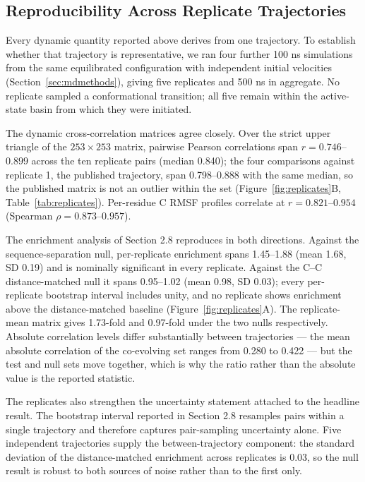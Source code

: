 \documentclass[utf8]{FrontiersinHarvard}
\begin{document}
\subsection{Reproducibility Across Replicate Trajectories}
\label{sec:replicates}

Every dynamic quantity reported above derives from one trajectory. To establish whether that trajectory is representative, we ran four further 100 ns simulations from the same equilibrated configuration with independent initial velocities (Section~\ref{sec:mdmethods}), giving five replicates and 500 ns in aggregate. No replicate sampled a conformational transition; all five remain within the active-state basin from which they were initiated.

The dynamic cross-correlation matrices agree closely. Over the strict upper triangle of the $253\times253$ matrix, pairwise Pearson correlations span $r = 0.746$--$0.899$ across the ten replicate pairs (median 0.840); the four comparisons against replicate 1, the published trajectory, span 0.798--0.888 with the same median, so the published matrix is not an outlier within the set (Figure~\ref{fig:replicates}B, Table~\ref{tab:replicates}). Per-residue C\textalpha{} RMSF profiles correlate at $r = 0.821$--$0.954$ (Spearman $\rho = 0.873$--$0.957$).

The enrichment analysis of Section 2.8 reproduces in both directions. Against the sequence-separation null, per-replicate enrichment spans 1.45--1.88 (mean 1.68, SD 0.19) and is nominally significant in every replicate. Against the C\textalpha{}--C\textalpha{} distance-matched null it spans 0.95--1.02 (mean 0.98, SD 0.03); every per-replicate bootstrap interval includes unity, and no replicate shows enrichment above the distance-matched baseline (Figure~\ref{fig:replicates}A). The replicate-mean matrix gives 1.73-fold and 0.97-fold under the two nulls respectively. Absolute correlation levels differ substantially between trajectories --- the mean absolute correlation of the co-evolving set ranges from 0.280 to 0.422 --- but the test and null sets move together, which is why the ratio rather than the absolute value is the reported statistic.

The replicates also strengthen the uncertainty statement attached to the headline result. The bootstrap interval reported in Section 2.8 resamples pairs within a single trajectory and therefore captures pair-sampling uncertainty alone. Five independent trajectories supply the between-trajectory component: the standard deviation of the distance-matched enrichment across replicates is 0.03, so the null result is robust to both sources of noise rather than to the first only.
\end{document}

